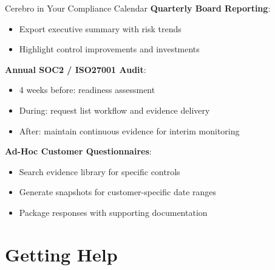 \documentclass[aspectratio=169]{beamer}
\begin{document}
\begin{frame}{Cerebro in Your Compliance Calendar}
  \textbf{Quarterly Board Reporting}:
  \begin{itemize}
    \item Export executive summary with risk trends
    \item Highlight control improvements and investments
  \end{itemize}
  
  \vspace{0.3cm}
  
  \textbf{Annual SOC2 / ISO27001 Audit}:
  \begin{itemize}
    \item 4 weeks before: readiness assessment
    \item During: request list workflow and evidence delivery
    \item After: maintain continuous evidence for interim monitoring
  \end{itemize}
  
  \vspace{0.3cm}
  
  \textbf{Ad-Hoc Customer Questionnaires}:
  \begin{itemize}
    \item Search evidence library for specific controls
    \item Generate snapshots for customer-specific date ranges
    \item Package responses with supporting documentation
  \end{itemize}
\end{frame}

\section{Getting Help}
\end{document}
